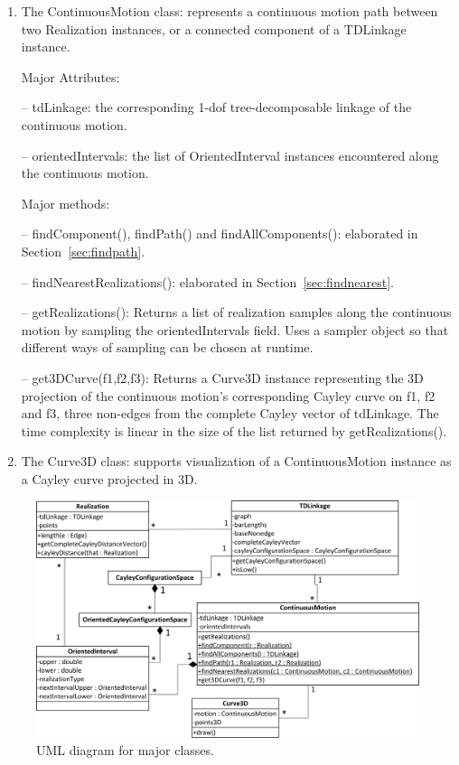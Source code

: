 \documentclass[10pt]{article}
\begin{document}
\begin{enumerate}


\item The \textsf{ContinuousMotion} class: represents a continuous motion path between two \textsf{Realization} instances, or a connected component of a \textsf{TDLinkage} instance. 


\noindent  Major Attributes:

\noindent -- \textsf{tdLinkage}: 
the corresponding 1-dof tree-decomposable linkage of the continuous motion. 

\noindent --  \textsf{orientedIntervals}: 
the list of \textsf{OrientedInterval} instances encountered along the continuous motion.

\smallskip

\noindent Major methods:

\noindent -- \textsf{findComponent()}, \textsf{findPath()} and \textsf{findAllComponents()}: elaborated in Section~\ref{sec:findpath}.

\noindent -- \textsf{findNearestRealizations()}: elaborated in Section~\ref{sec:findnearest}.


\noindent -- \textsf{getRealizations()}: 
Returns a list of realization samples along the continuous motion by sampling the \textsf{orientedIntervals} field. 
Uses a sampler object so that different ways of sampling can be chosen at runtime. 

\noindent --  \textsf{get3DCurve(f1,f2,f3)}: 
Returns a \textsf{Curve3D} instance representing the 3D projection of the continuous motion's corresponding Cayley curve
on \textsf{f1}, \textsf{f2} and \textsf{f3}, three non-edges from the complete Cayley vector of tdLinkage. 
The time complexity is linear in the size of the list returned by \textsf{getRealizations()}.


\item The \textsf{Curve3D} class: supports visualization of a  \textsf{ContinuousMotion} instance as a Cayley curve projected in 3D.

\end{enumerate}

\begin{figure}[tp]
\begin{center}
\includegraphics[width=0.8\linewidth]{img/uml}
\end{center}
\caption{UML diagram for major classes. }
\label{fig:uml}
\end{figure}
\end{document}
